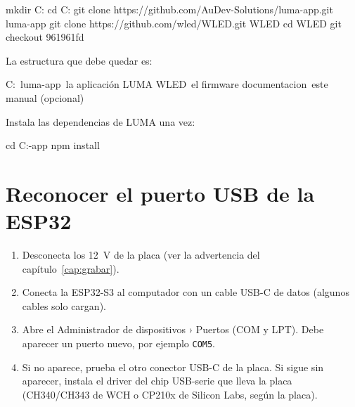 
\begin{comando}
mkdir C:\Proyectos\LUMA
cd C:\Proyectos\LUMA
git clone https://github.com/AuDev-Solutions/luma-app.git luma-app
git clone https://github.com/wled/WLED.git WLED
cd WLED
git checkout 961961fd
\end{comando}


La estructura que debe quedar es:
\begin{comando}
C:\Proyectos\LUMA\
    luma-app\        la aplicación LUMA
    WLED\            el firmware
    documentacion\   este manual (opcional)
\end{comando}

Instala las dependencias de LUMA una vez:
\begin{comando}
cd C:\Proyectos\LUMA\luma-app
npm install
\end{comando}

\section{Reconocer el puerto USB de la ESP32}

\begin{enumerate}
\item Desconecta los 12~V de la placa (ver la advertencia del capítulo~\ref{cap:grabar}).
\item Conecta la ESP32-S3 al computador con un cable USB-C de datos (algunos cables solo cargan).
\item Abre el Administrador de dispositivos › Puertos (COM y LPT). Debe aparecer un puerto nuevo, por ejemplo \texttt{COM5}.
\item Si no aparece, prueba el otro conector USB-C de la placa. Si sigue sin aparecer, instala el driver del chip USB-serie que lleva la placa (CH340/CH343 de WCH o CP210x de Silicon Labs, según la placa).
\end{enumerate}

